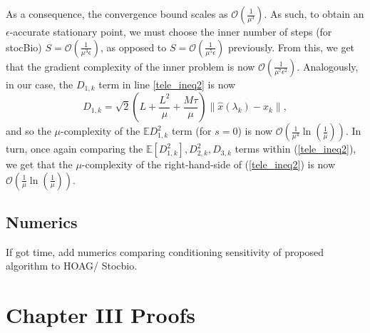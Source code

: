 \documentclass[11pt, twoside]{report}
\begin{document}
As a consequence, the convergence bound scales as $\mathcal{O}\left(\frac{1}{\mu^3}\right)$. As such, to obtain an $\epsilon$-accurate stationary point, we must choose the inner number of steps (for stocBio) $S = \mathcal{O}(\frac{1}{\mu^3 \epsilon})$, as opposed to $S = \mathcal{O}(\frac{1}{\mu^5 \epsilon})$ previously. From this, we get that the gradient complexity of the inner problem is now $\mathcal{O}(\frac{1}{\mu^7 \epsilon^2})$. Analogously, in our case, the $D_{1,k}$ term in line \ref{tele_ineq2} is now
\[D_{1,k} = \sqrt{2}\left(L + \frac{L^2}{\mu} + \frac{M\tau}{\mu} \right) \|\hat{x}(\lambda_k) - x_k\|,\]
and so the $\mu$-complexity of the $\mathbb{E}D_{1,k}^2$ term (for $s=0$) is now $\mathcal{O}\left(\frac{1}{\mu^4} \ln{\left( \frac{1}{\mu} \right)} \right)$. In turn, once again comparing the $\mathbb{E} [D_{1,k}^2], D_{2,k}^2, D_{3,k}$ terms within (\ref{tele_ineq2}), we get that the $\mu$-complexity of the right-hand-side of (\ref{tele_ineq2}) is now $\mathcal{O}\left(\frac{1}{\mu} \ln{\left( \frac{1}{\mu} \right)} \right)$.

\section{Numerics}
\begin{mdframed}[hidealllines=true,backgroundcolor=yellow!20]
    If got time, add numerics comparing conditioning sensitivity of proposed algorithm to HOAG/ Stocbio.
\end{mdframed}





\appendix

\chapter{Chapter III Proofs}
\label{bayesian_proofs}
\end{document}
